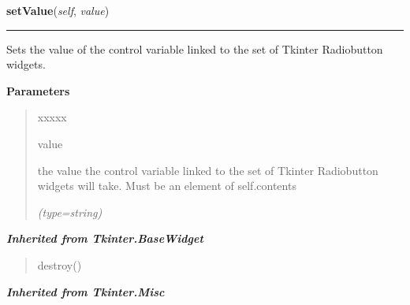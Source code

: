     \vspace{0.5ex}

\hspace{.8\funcindent}\begin{boxedminipage}{\funcwidth}

    \raggedright \textbf{setValue}(\textit{self}, \textit{value})

    \vspace{-1.5ex}

    \rule{\textwidth}{0.5\fboxrule}
\setlength{\parskip}{2ex}
    Sets the value of the control variable linked to the set of Tkinter 
    Radiobutton widgets.

\setlength{\parskip}{1ex}
      \textbf{Parameters}
      \vspace{-1ex}

      \begin{quote}
        \begin{Ventry}{xxxxx}

          \item[value]

          the value the control variable linked to the set of Tkinter 
          Radiobutton widgets will take. Must be an element of 
          {\textbar}self.contents{\textbar}

            {\it (type=string)}

        \end{Ventry}

      \end{quote}

    \end{boxedminipage}


\large{\textbf{\textit{Inherited from Tkinter.BaseWidget}}}

\begin{quote}
destroy()
\end{quote}

\large{\textbf{\textit{Inherited from Tkinter.Misc}}}

